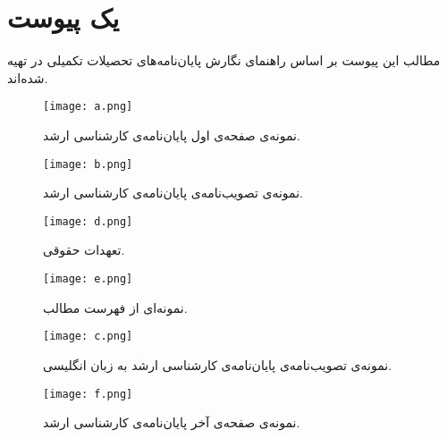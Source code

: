 \chapter{یک پیوست}
مطالب این پیوست بر اساس راهنمای نگارش پایان‌نامه‌های تحصیلات تکمیلی در \cite{vru_grad_rules} تهیه شده‌اند. 

	\begin{figure}
		\texttt{[image: a.png]}
		\caption{نمونه‌ی صفحه‌ی اول پایان‌نامه‌ی کارشناسی ارشد.}
		\label{app1}
	\end{figure}

	\begin{figure}
		\texttt{[image: b.png]}
		\caption{نمونه‌ی تصویب‌نامه‌ی پایان‌نامه‌ی کارشناسی ارشد.}
		\label{app2}
	\end{figure}

	\begin{figure}
		\texttt{[image: d.png]}
		\caption{تعهدات حقوقی.}
		\label{app4}
	\end{figure}

	\begin{figure}
		\texttt{[image: e.png]}
		\caption{نمونه‌ای از فهرست مطالب.}
		\label{app5}
	\end{figure}

	\begin{figure}
		\texttt{[image: c.png]}
		\caption{نمونه‌ی تصویب‌نامه‌ی پایان‌نامه‌ی کارشناسی ارشد به زبان انگلیسی.}
		\label{app3}
	\end{figure}

	\begin{figure}
		\texttt{[image: f.png]}
		\caption{نمونه‌ی صفحه‌ی آخر پایان‌نامه‌ی کارشناسی ارشد.}
		\label{app6}
	\end{figure}
